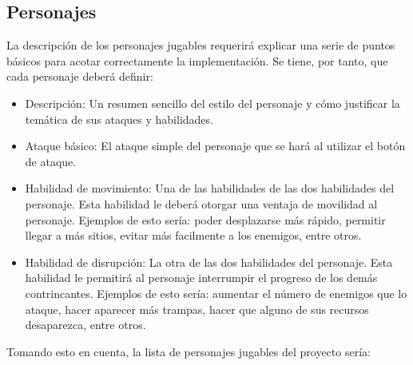 \subsection{Personajes}\label{subsec:playable-characters}


La descripción de los personajes jugables requerirá explicar una serie de puntos
básicos para acotar correctamente la implementación. Se tiene, por tanto, que
cada personaje deberá definir:
\begin{itemize}
    \item Descripción: Un resumen sencillo del estilo del personaje y cómo
    justificar la temática de sus ataques y habilidades.
    \item Ataque básico: El ataque simple del personaje que se hará al utilizar
    el botón de ataque.
    \item Habilidad de movimiento: Una de las habilidades de las dos habilidades
    del personaje. Esta habilidad le deberá otorgar una ventaja de movilidad al
    personaje. Ejemplos de esto sería: poder desplazarse más rápido, permitir
    llegar a más sitios, evitar más facilmente a los enemigos, entre otros.
    \item Habilidad de disrupción: La otra de las dos habilidades del personaje.
    Esta habilidad le permitirá al personaje interrumpir el progreso de los
    demás contrincantes. Ejemplos de esto sería: aumentar el número de enemigos
    que lo ataque, hacer aparecer más trampas, hacer que alguno de sus recursos
    desaparezca, entre otros.
\end{itemize}

Tomando esto en cuenta, la lista de personajes jugables del proyecto sería:

